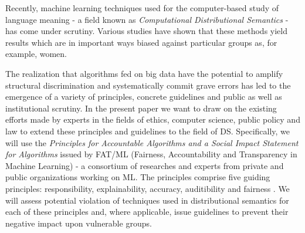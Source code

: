 \documentclass{article}
\begin{document}
Recently, machine learning techniques used for the computer-based study of language meaning - a field known as \emph{Computational Distributional Semantics} - has come under scrutiny.
Various studies have shown that these methods yield results which are in important ways biased against particular groups as, for example, women. \cite{google}


The realization that algorithms fed on big data have the potential to amplify structural discrimination and systematically commit grave errors has led to the emergence of a variety of principles, concrete guidelines and public as well as institutional scrutiny.
In the present paper we want to draw on the existing efforts made by experts in the fields of ethics, computer science, public policy and law to extend these principles and guidelines to the field of DS. Specifically, we will use the \emph{Principles for Accountable Algorithms and a Social Impact Statement for Algorithms} issued by FAT/ML (Fairness, Accountability and Transparency in Machine Learning) - a consortium of researches and experts from private and public organizations working on ML. 
The principles comprise five guiding principles: responsibility, explainability, accuracy, auditibility and fairness \cite{principles}.
We will assess potential violation of techniques used in distributional semantics for each of these principles and, where applicable, issue guidelines to prevent their negative impact upon vulnerable groups.
\end{document}
